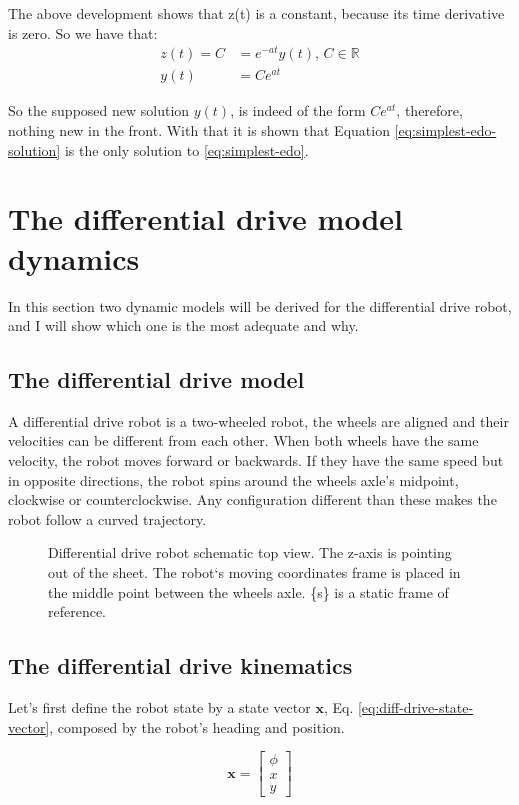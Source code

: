 \documentclass[12pt]{article}
\begin{document}
The above development shows that z(t) is a constant, because its time derivative is zero. So we have that:
\begin{align*}
    z(t) = C &= e^{-at} y(t), \, C \in \mathbb{R}\\
    y(t) &= C e^{at}
\end{align*}

So the supposed new solution $y(t)$, is indeed of the form $C e^{at}$, therefore, nothing new in the front. With that it is shown that Equation \ref{eq:simplest-edo-solution} is the only solution to \ref{eq:simplest-edo}.


\section{The differential drive model dynamics}
In this section two dynamic models will be derived for the differential drive robot, and I will show which one is the most adequate and why.

\subsection{The differential drive model}
A differential drive robot is a two-wheeled robot, the wheels are aligned and their velocities can be different from each other. When both wheels have the same velocity, the robot moves forward or backwards. If they have the same speed but in opposite directions, the robot spins around the wheels axle's midpoint, clockwise or counterclockwise. Any configuration different than these makes the robot follow a curved trajectory.  

\begin{figure}[h]
    \centering
    
    \caption{Differential drive robot schematic top view. The z-axis is pointing out of the sheet. The robot`s moving coordinates frame is placed in the middle point between the wheels axle. \{s\} is a static frame of reference.}
    \label{fig:diff-drive-schematic}
\end{figure}

\subsection{The differential drive kinematics}
Let's first define the robot state by a state vector $\mathbf{x}$, Eq. \ref{eq:diff-drive-state-vector}, composed by the robot's heading and position.

\begin{equation}
    \mathbf{x} = \begin{bmatrix}
        \phi \\ x \\ y 
    \end{bmatrix}
    \label{eq:diff-drive-state-vector}
\end{equation}
\end{document}
